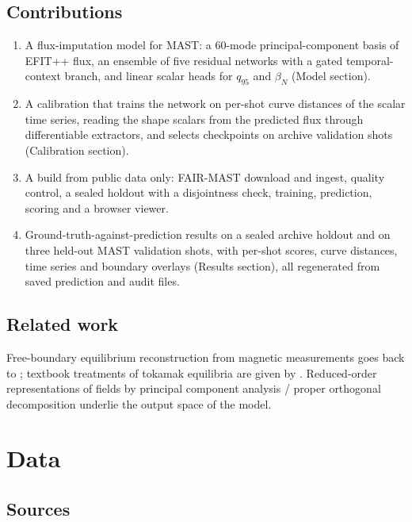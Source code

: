 \documentclass[11pt,a4paper]{article}
\numberwithin{equation}{section}
\begin{document}
\hypertarget{contributions}{%
\subsection{Contributions}\label{contributions}}

\begin{enumerate}
\def\labelenumi{\arabic{enumi}.}
\item
  A flux-imputation model for MAST: a 60-mode principal-component basis of EFIT++ flux, an ensemble of five residual networks with a gated temporal-context branch, and linear scalar heads for \(q_{95}\) and \(\beta_N\) (Model section).
\item
  A calibration that trains the network on per-shot curve distances of the scalar time series, reading the shape scalars from the predicted flux through differentiable extractors, and selects checkpoints on archive validation shots (Calibration section).
\item
  A build from public data only: FAIR-MAST download and ingest, quality control, a sealed holdout with a disjointness check, training, prediction, scoring and a browser viewer.
\item
  Ground-truth-against-prediction results on a sealed archive holdout and on three held-out MAST validation shots, with per-shot scores, curve distances, time series and boundary overlays (Results section), all regenerated from saved prediction and audit files.
\end{enumerate}

\hypertarget{related-work}{%
\subsection{Related work}\label{related-work}}

Free-boundary equilibrium reconstruction from magnetic measurements goes back to \cite{lao1985}; textbook treatments of tokamak equilibria are given by \cite{freidberg2014,wesson2011}. Reduced-order representations of fields by principal component analysis / proper orthogonal decomposition \cite{pearson1901,hotelling1933,berkooz1993} underlie the output space of the model.

\hypertarget{data}{%
\clearpage
\section{Data}\label{data}}

\hypertarget{sources}{%
\subsection{Sources}\label{sources}}
\end{document}
